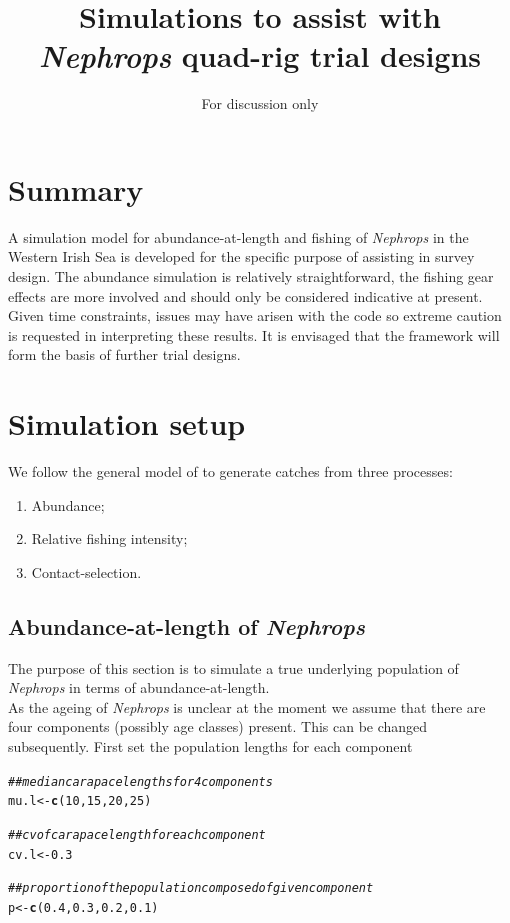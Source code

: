 \documentclass[12pt]{article}\usepackage[]{graphicx}\usepackage[]{color}
\title{Simulations to assist with \emph{Nephrops} quad-rig trial designs}
\author{For discussion only}
\date{}
\makeatletter
\newcommand{\hlnum}[1]{\textcolor[rgb]{0.686,0.059,0.569}{#1}}%
\newcommand{\hlcom}[1]{\textcolor[rgb]{0.678,0.584,0.686}{\textit{#1}}}%
\newcommand{\hlstd}[1]{\textcolor[rgb]{0.345,0.345,0.345}{#1}}%
\newcommand{\hlkwb}[1]{\textcolor[rgb]{0.69,0.353,0.396}{#1}}%
\newcommand{\hlkwd}[1]{\textcolor[rgb]{0.737,0.353,0.396}{\textbf{#1}}}%
\newenvironment{kframe}{%
 \def\at@end@of@kframe{}%
 \ifinner\ifhmode%
  \def\at@end@of@kframe{\end{minipage}}%
  \begin{minipage}{\columnwidth}%
 \fi\fi%
 \def\FrameCommand##1{\hskip\@totalleftmargin \hskip-\fboxsep
 \colorbox{shadecolor}{##1}\hskip-\fboxsep
     \hskip-\linewidth \hskip-\@totalleftmargin \hskip\columnwidth}%
 \MakeFramed {\advance\hsize-\width
   \@totalleftmargin\z@ \linewidth\hsize
   \@setminipage}}%
 {\par\unskip\endMakeFramed%
 \at@end@of@kframe}
\newenvironment{knitrout}{}{} %
\makeatother
\begin{document}
\maketitle

\section{Summary}
A simulation model for abundance-at-length and fishing of \emph{Nephrops} in the Western Irish Sea is developed for the specific purpose of assisting in survey design. The abundance simulation is relatively straightforward, the fishing gear effects are more involved and should only be considered indicative at present. Given time constraints, issues may have arisen with the code so extreme caution is requested in interpreting these results. It is envisaged that the framework will form the basis of further trial designs.  
\section{Simulation setup}
We follow the general model of \citet{Millar:Fryer:1999} to generate catches from three processes:
\begin{enumerate}
 \item Abundance;
 \item Relative fishing intensity;
 \item Contact-selection.
\end{enumerate}

\subsection{Abundance-at-length of \emph{Nephrops}}
The purpose of this section is to simulate a true underlying population of \emph{Nephrops} in terms of abundance-at-length.\\
As the ageing of \emph{Nephrops} is unclear at the moment we assume that there are four components (possibly age classes) present. This can be changed subsequently. First set the population lengths for each component

\begin{knitrout}\footnotesize
{}\color{fgcolor}\begin{kframe}
\begin{alltt}
\hlcom{## median carapace lengths for 4 components}
\hlstd{mu.l} \hlkwb{<-} \hlkwd{c}\hlstd{(}\hlnum{10}\hlstd{,} \hlnum{15}\hlstd{,} \hlnum{20}\hlstd{,} \hlnum{25}\hlstd{)}

\hlcom{## cv of carapace length for each component}
\hlstd{cv.l} \hlkwb{<-} \hlnum{0.3}

\hlcom{## proportion of the population composed of given component}
\hlstd{p} \hlkwb{<-} \hlkwd{c}\hlstd{(}\hlnum{0.4}\hlstd{,} \hlnum{0.3}\hlstd{,} \hlnum{0.2}\hlstd{,} \hlnum{0.1}\hlstd{)}
\end{alltt}
\end{kframe}
\end{knitrout}
\end{document}
